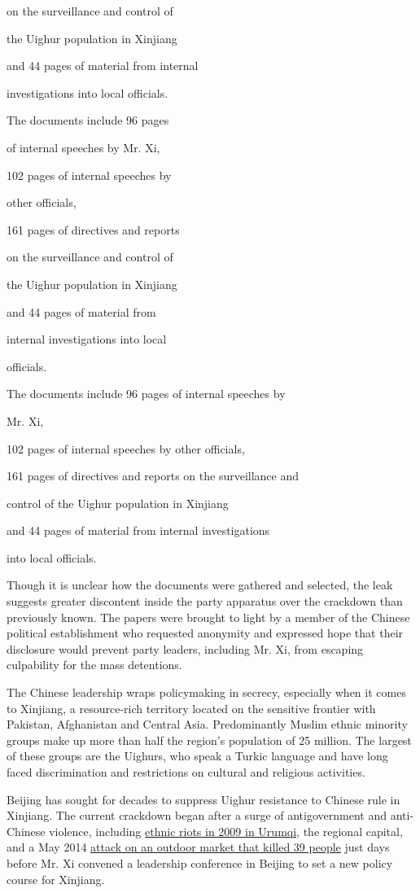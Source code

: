 on the surveillance and control of

the Uighur population in Xinjiang

and 44 pages of material from internal

investigations into local officials.

The documents include 96 pages

of internal speeches by Mr. Xi,

102 pages of internal speeches by

other officials,

161 pages of directives and reports

on the surveillance and control of

the Uighur population in Xinjiang

and 44 pages of material from

internal investigations into local

officials.

The documents include 96 pages of internal speeches by

Mr. Xi,

102 pages of internal speeches by other officials,

161 pages of directives and reports on the surveillance and

control of the Uighur population in Xinjiang

and 44 pages of material from internal investigations

into local officials.

Though it is unclear how the documents were gathered and selected, the
leak suggests greater discontent inside the party apparatus over the
crackdown than previously known. The papers were brought to light by a
member of the Chinese political establishment who requested anonymity
and expressed hope that their disclosure would prevent party leaders,
including Mr. Xi, from escaping culpability for the mass detentions.

The Chinese leadership wraps policymaking in secrecy, especially when it
comes to Xinjiang, a resource-rich territory located on the sensitive
frontier with Pakistan, Afghanistan and Central Asia. Predominantly
Muslim ethnic minority groups make up more than half the region's
population of 25 million. The largest of these groups are the Uighurs,
who speak a Turkic language and have long faced discrimination and
restrictions on cultural and religious activities.

Beijing has sought for decades to suppress Uighur resistance to Chinese
rule in Xinjiang. The current crackdown began after a surge of
antigovernment and anti-Chinese violence, including
\href{https://www.nytimes3xbfgragh.onion/2009/07/18/world/asia/18xinjiang.html}{ethnic
riots in 2009 in Urumqi}, the regional capital, and a May 2014
\href{https://www.nytimes3xbfgragh.onion/2014/12/09/world/asia/8-sentenced-to-death-for-terrorist-attacks-in-western-china.html}{attack
on an outdoor market that killed 39 people} just days before Mr. Xi
convened a leadership conference in Beijing to set a new policy course
for Xinjiang.

